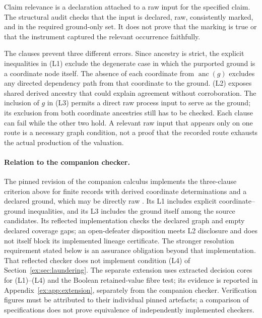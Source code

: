 \documentclass[11pt]{article}
\theoremstyle{definition}
\begin{document}
Claim relevance is a declaration attached to a raw input for the specified claim. The structural audit checks that the input is declared, raw, consistently marked, and in the required ground-only set. It does not prove that the marking is true or that the instrument captured the relevant occurrence faithfully.

The clauses prevent three different errors. Since ancestry is strict, the explicit inequalities in (L1) exclude the degenerate case in which the purported ground is a coordinate node itself. The absence of each coordinate from $\operatorname{anc}(g)$ excludes any directed dependency path from that coordinate to the ground. (L2) exposes shared derived ancestry that could explain agreement without corroboration. The inclusion of $g$ in (L3) permits a direct raw process input to serve as the ground; its exclusion from both coordinate ancestries still has to be checked. Each clause can fail while the other two hold. A relevant raw input that appears only on one route is a necessary graph condition, not a proof that the recorded route exhausts the actual production of the valuation.

\paragraph{Relation to the companion checker.}
The pinned revision of the companion calculus implements the three-clause criterion
above for finite records with derived coordinate determinations and
a declared ground, which may be directly raw
\citep{moore2026transport}. Its L1 includes explicit coordinate--ground
inequalities, and its L3 includes the ground itself among the source
candidates. Its reflected implementation checks the declared graph
and empty declared coverage gaps; an open-defeater disposition meets
L2 disclosure and does not itself block its implemented lineage
certificate. The stronger resolution requirement stated below is
an assurance obligation beyond that implementation.
That reflected checker does not implement condition (L4) of
Section~\ref{ex:sec:laundering}. The separate extension uses extracted decision cores for
(L1)--(L4) and the Boolean retained-value fibre test; its evidence is reported
in Appendix~\ref{ex:app:extension}, separately from the companion checker.
Verification figures must be attributed to their individual pinned
artefacts; a comparison of specifications does not prove equivalence
of independently implemented checkers.
\end{document}
